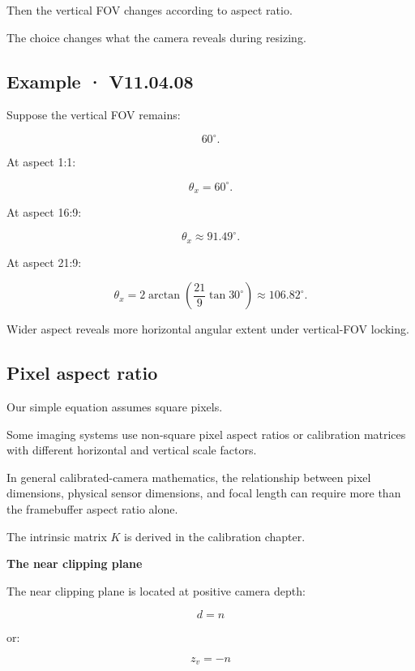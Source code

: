 Then the vertical FOV changes according to aspect ratio.

The choice changes what the camera reveals during resizing.

\begin{allmightroleexample}

\subsection{Example · V11.04.08}\label{02-foundations-ii-ch033-example-v11.04.08}

Suppose the vertical FOV remains:

\end{allmightroleexample}

\[
 60^\circ.
\]

At aspect 1:1:

\[
 \theta_x=60^\circ.
\]

At aspect 16:9:

\[
 \theta_x\approx91.49^\circ.
\]

At aspect 21:9:

\[
 \theta_x= 2\arctan\left(\frac{21}{9}\tan30^\circ\right) \approx106.82^\circ.
\]

Wider aspect reveals more horizontal angular extent under vertical-FOV locking.

\subsection{Pixel aspect ratio}\label{02-foundations-ii-ch033-pixel-aspect-ratio}

Our simple equation assumes square pixels.

Some imaging systems use non-square pixel aspect ratios or calibration matrices with different horizontal and vertical scale factors.

In general calibrated-camera mathematics, the relationship between pixel dimensions, physical sensor dimensions, and focal length can require more than the framebuffer aspect ratio alone.

The intrinsic matrix \(K\) is derived in the calibration chapter.

\textbf{The near clipping plane}

The near clipping plane is located at positive camera depth:

\[
 \boxed{d=n}
\]

or:

\[
 z_v=-n
\]

